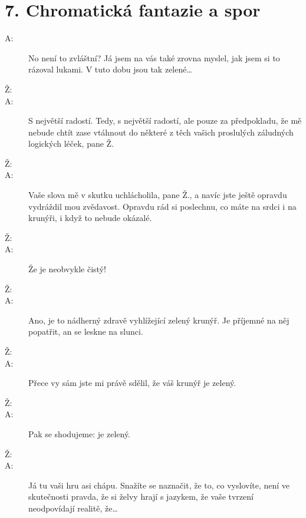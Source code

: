 \documentclass[12pt]{article}
\begin{document}
\section*{7. Chromatická fantazie a spor}

\begin{description}

\item[A:] No není to zvláštní? Já jsem na vás také zrovna myslel, jak jsem si
    to rázoval lukami. V tuto dobu jsou tak zelené…

\item[Ž:]

\item[A:] S největší radostí. Tedy, s největší radostí, ale pouze za předpokladu,
    že mě nebude chtít zase vtáhnout do některé z těch vašich proslulých
    záludných logických léček, pane Ž.

\item[Ž:]

\item[A:] Vaše slova mě v skutku uchlácholila, pane Ž., a navíc jste ještě opravdu
    vydráždil mou zvědavost. Opravdu rád si poslechnu, co máte na srdci i na krunýři,
    i když to nebude okázalé.

\item[Ž:]

\item[A:] Že je neobvykle čistý!

\item[Ž:]

\item[A:] Ano, je to nádherný zdravě vyhlížející zelený krunýř. Je příjemné
    na něj popatřit, an se leskne na slunci.

\item[Ž:]

\item[A:] Přece vy sám jste mi právě sdělil, že váš krunýř je zelený.

\item[Ž:]

\item[A:] Pak se shodujeme: je zelený.

\item[Ž:]

\item[A:] Já tu vaši hru asi chápu. Snažíte se naznačit, že to, co vyslovíte,
    není ve skutečnosti pravda, že si želvy hrají s jazykem, že vaše tvrzení neodpovídají
    realitě, že…



\end{description}
\end{document}
